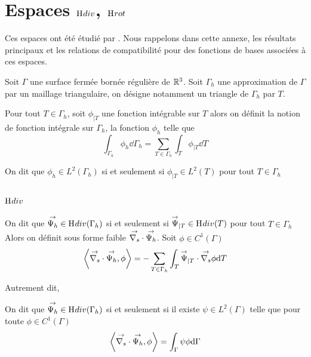 \section[Espaces Hdiv Hrot]{Espaces \(\mathrm{H}_\mathrm{{}}{div}\), \(\mathrm{H}_\mathrm{{}}{rot}\)}

Ces espaces ont été étudié par \cite{nedelec_mixed_1980}. Nous rappelons dans cette annexe, les résultats principaux et les relations de compatibilité pour des fonctions de bases associées à ces espaces.

Soit \(\Gamma\) une surface fermée bornée régulière de \(\mathbb R^3\). 
Soit \(\Gamma_h\) une approximation de \(\Gamma\) par un maillage triangulaire, on désigne notamment un triangle de \(\Gamma_h\) par \(T\).

\begin{defn}
    Pour tout \(T \in \Gamma_h\), soit \(\phi_{|T}\) une fonction intégrable sur \(T\) alors
    on définit la notion de fonction intégrale sur \(\Gamma_h\), la fonction \(\phi_h\) telle que
    \begin{equation}
        \int_{\Gamma_h} \phi_h \dd{\Gamma_h} = \sum_{T\in\Gamma_h} \int_T \phi_{|T} \dd{T}
    \end{equation}
\end{defn}

\begin{defn}
    On dit que \(\phi_h \in L^2(\Gamma_h)\) si et seulement si \(\phi_{|T} \in L^2(T)\) pour tout \(T \in \Gamma_h\)
\end{defn}

\subsection[Hdiv]{\(\mathrm{H}_\mathrm{{}}{div}\)}

\begin{defn}
    On dit que \({\overset{\rightarrow}{\Psi_h}} \in \mathrm{H}_\mathrm{{}}{div}(\Gamma_h)\) si et seulement si \({\overset{\rightarrow}{\Psi}}_{|T} \in \mathrm{H}_\mathrm{{}}{div}(T)\) pour tout \(T \in \Gamma_h\)
    Alors on définit sous forme faible \({\overset{\rightarrow}{\nabla_s}} \cdot {\overset{\rightarrow}{\Psi_h}} \).
    Soit \(\phi \in C^1(\Gamma)\) 
    \begin{equation}
        \left< \vdivs \vect{\Psi_h}, \phi \right> %
        = - \sum_{T\in\Gamma_h} \int_T \vect{\Psi}_{|T} \cdot \vgrads \phi\dd{T}
    \end{equation}
\end{defn}

Autrement dit, \cite[eq.~5.3]{bendali_equations_2014}
\begin{defn}
    On dit que \({\overset{\rightarrow}{\Psi_h}} \in \mathrm{H}_\mathrm{{}}{div}(\Gamma_h)\) si et seulement si il existe \(\psi\in L^2(\Gamma)\) telle que pour toute \(\phi \in C^1(\Gamma)\) 
    \begin{equation}
        \left< {\overset{\rightarrow}{\nabla_s}} \cdot {\overset{\rightarrow}{\Psi_h}}, \phi \right> = \int_\Gamma \psi \phi \mathrm{d}{\Gamma}
    \end{equation}
\end{defn}

